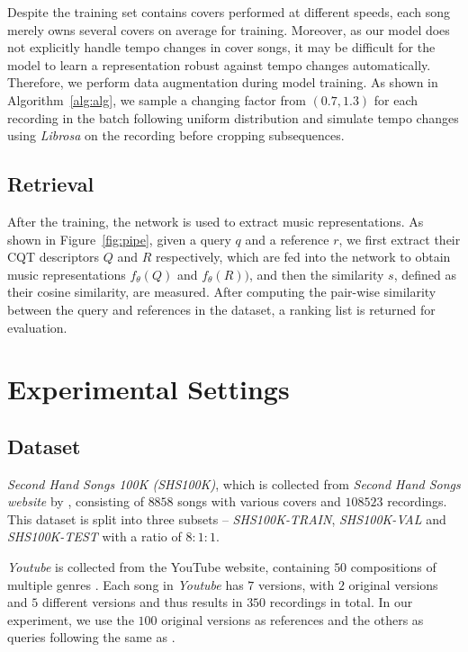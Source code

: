 \documentclass{article}
\newcommand{\figref}[1]{\mbox{Figure~\ref{#1}}}
\newcommand{\algref}[1]{\mbox{Algorithm~\ref{#1}}}
\begin{document}
Despite the training set contains covers performed at different speeds, each song merely owns several covers on average for training. Moreover, as our model does not explicitly handle tempo changes in cover songs, it may be difficult for the model to learn a representation robust against tempo changes automatically. Therefore, we perform data augmentation during model training. As shown in \algref{alg:alg}, we sample a changing factor from $(0.7, 1.3)$ for each recording in the batch following uniform distribution and simulate tempo changes using \textit{Librosa} \cite{mcfee2015librosa} on the recording before cropping subsequences. 

\subsection{Retrieval}
After the training, the network is used to extract music representations. As shown in \figref{fig:pipe}, given a query $q$ and a reference $r$, we first extract their CQT descriptors $Q$ and $R$ respectively, which are fed into the network to obtain music representations $f_\theta(Q)$ and $f_\theta(R))$, and then the similarity $s$, defined as their cosine similarity, are measured.
After computing the pair-wise similarity between the query and references in the dataset, a ranking list is returned for evaluation.




\section{Experimental Settings}
\label{sec:evaluation}

\subsection{Dataset}


\textit{Second Hand Songs 100K (SHS100K)}, which is collected from \textit{Second Hand Songs website} by \cite{xu2018key}, consisting of $8858$ songs with various covers and $108523$ recordings. This dataset is split into three subsets -- \textit{SHS100K-TRAIN}, \textit{SHS100K-VAL} and \textit{SHS100K-TEST} with a ratio of $8:1:1$.

\textit{Youtube} is collected from the YouTube website, containing $50$ compositions of multiple genres \cite{silva2015music}. Each song in \textit{Youtube} has $7$ versions, with $2$ original versions and $5$ different versions and thus results in $350$ recordings in total. In our experiment, we use the $100$ original versions as references and the others as queries following the same as \cite{silva2016simple,yu2019temporal,xu2018key}.
\end{document}
